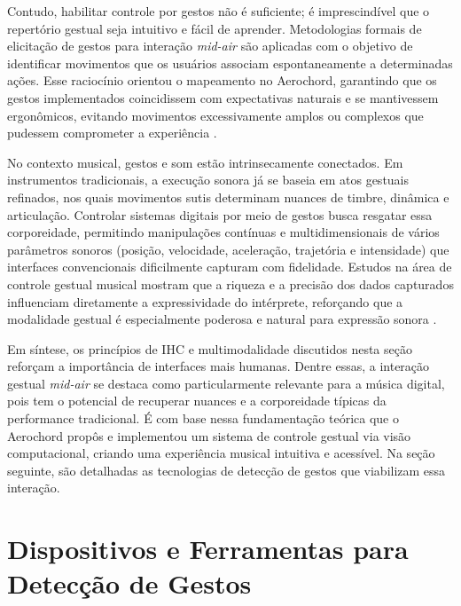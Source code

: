 Contudo, habilitar controle por gestos não é suficiente; é imprescindível que o repertório gestual seja intuitivo e fácil de aprender. Metodologias formais de elicitação de gestos para interação \textit{mid-air} são aplicadas com o objetivo de identificar movimentos que os usuários associam espontaneamente a determinadas ações. Esse raciocínio orientou o mapeamento no Aerochord, garantindo que os gestos implementados coincidissem com expectativas naturais e se mantivessem ergonômicos, evitando movimentos excessivamente amplos ou complexos que pudessem comprometer a experiência \cite{vogiatzidakis2018gesture}.

No contexto musical, gestos e som estão intrinsecamente conectados. Em instrumentos tradicionais, a execução sonora já se baseia em atos gestuais refinados, nos quais movimentos sutis determinam nuances de timbre, dinâmica e articulação. Controlar sistemas digitais por meio de gestos busca resgatar essa corporeidade, permitindo manipulações contínuas e multidimensionais de vários parâmetros sonoros (posição, velocidade, aceleração, trajetória e intensidade) que interfaces convencionais dificilmente capturam com fidelidade. Estudos na área de controle gestual musical mostram que a riqueza e a precisão dos dados capturados influenciam diretamente a expressividade do intérprete, reforçando que a modalidade gestual é especialmente poderosa e natural para expressão sonora \cite{wanderley2001gestural, cadoz2000gesture}.

Em síntese, os princípios de IHC e multimodalidade discutidos nesta seção reforçam a importância de interfaces mais humanas. Dentre essas, a interação gestual \textit{mid-air} se destaca como particularmente relevante para a música digital, pois tem o potencial de recuperar nuances e a corporeidade típicas da performance tradicional. É com base nessa fundamentação teórica que o Aerochord propôs e implementou um sistema de controle gestual via visão computacional, criando uma experiência musical intuitiva e acessível. Na seção seguinte, são detalhadas as tecnologias de detecção de gestos que viabilizam essa interação.

\section{Dispositivos e Ferramentas para Detecção de Gestos}
\label{sec:dispositivos_e_ferramentas_deteccao_gestos}

